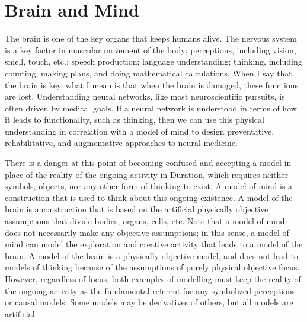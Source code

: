 \section{Brain and Mind}

The brain is one of the key organs that keeps humans alive.  The
nervous system is a key factor in muscular movement of the body;
perceptions, including vision, smell, touch, etc.; speech production;
language understanding; thinking, including counting, making plans,
and doing mathematical calculations.  When I say that the brain is
key, what I mean is that when the brain is damaged, these functions
are lost.  Understanding neural networks, like most neuroscientific
pursuits, is often driven by medical goals.  If a neural network is
understood in terms of how it leads to functionality, such as
thinking, then we can use this physical understanding in correlation
with a model of mind to design preventative, rehabilitative, and
augmentative approaches to neural medicine.

There is a danger at this point of becoming confused and accepting a
model in place of the reality of the ongoing activity in Duration,
which requires neither symbols, objects, nor any other form of
thinking to exist.  A model of mind is a construction that is used to
think about this ongoing existence.  A model of the brain is a
construction that is based on the artificial physically objective
assumptions that divide bodies, organs, cells, etc.  Note that a model
of mind does not necessarily make any objective assumptions; in this
sense, a model of mind can model the exploration and creative activity
that leads to a model of the brain.  A model of the brain is a
physically objective model, and does not lead to models of thinking
because of the assumptions of purely physical objective focus.
However, regardless of focus, both examples of modelling must keep the
reality of the ongoing activity as the fundamental referent for any
symbolized perceptions or causal models.  Some models may be
derivatives of others, but all models are artificial.

